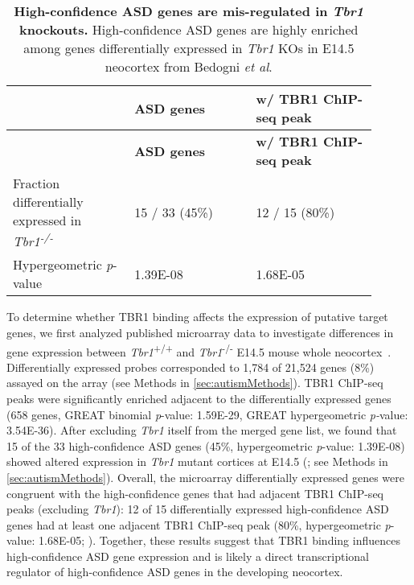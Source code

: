 \begin{center}
\begin{longtable}
{@{}p{0.3\linewidth}p{0.3\linewidth}p{0.3\linewidth}@{}}
\caption[High-confidence ASD genes are mis-regulated in
\emph{Tbr1} knockouts]{{\bf High-confidence ASD genes are mis-regulated in
\emph{Tbr1} knockouts.}
High-confidence ASD genes are highly enriched
among genes differentially expressed in \emph{Tbr1} KOs in E14.5
neocortex from Bedogni \emph{et al}.
}
\label{tab:autismTab2} \\

\hline ~ & \textbf{ASD genes} & \textbf{w/ TBR1 ChIP-seq peak} \\ \hline 
\endfirsthead

\hline ~ & \textbf{ASD genes} & \textbf{w/ TBR1 ChIP-seq peak} \\ \hline 
\endhead

\hline
\endlastfoot

Fraction differentially expressed in \emph{Tbr1\textsuperscript{-/-}} &
15 / 33 (45\%) & 12 / 15 (80\%)\tabularnewline
Hypergeometric \emph{p}-value & 1.39E-08 & 1.68E-05\tabularnewline
\end{longtable}
\end{center}

To determine whether TBR1 binding affects the expression of putative
target genes, we first analyzed published microarray data to investigate
differences in gene expression between \emph{Tbr1}\textsuperscript{+/+}
and \emph{Tbr1}\textsuperscript{-/-} E14.5 mouse whole neocortex~\citep{Bedogni:2010ew}. Differentially expressed probes corresponded to
1,784 of 21,524 genes (8\%) assayed on the array (see Methods in \ref{sec:autismMethods}). TBR1
ChIP-seq peaks were significantly enriched adjacent to the
differentially expressed genes (658 genes, GREAT binomial
\emph{p}-value: 1.59E-29, GREAT hypergeometric \emph{p-}value:
3.54E-36). After excluding \emph{Tbr1} itself from the merged gene list,
we found that 15 of the 33 high-confidence ASD genes (45\%,
hypergeometric \emph{p}-value: 1.39E-08) showed altered expression in
\emph{Tbr1} mutant cortices at E14.5 (; see Methods in \ref{sec:autismMethods}). Overall,
the microarray differentially expressed genes were congruent with the
high-confidence genes that had adjacent TBR1 ChIP-seq peaks (excluding
\emph{Tbr1}): 12 of 15 differentially expressed high-confidence ASD
genes had at least one adjacent TBR1 ChIP-seq peak (80\%, hypergeometric
\emph{p}-value: 1.68E-05; ). Together, these results suggest that
TBR1 binding influences high-confidence ASD gene expression and is
likely a direct transcriptional regulator of high-confidence ASD genes
in the developing neocortex.

